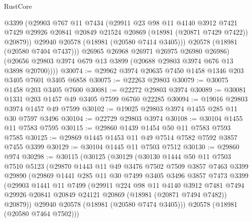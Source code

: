 \begin{lexlean}{RustCore}
\begin{coremodule}
              @3399
              (@29903
                @767
                @11
                @7434
                (@29911
                  @23
                  @98
                  @11
                  @4140
                  @3912
                  @7421
                  @7429
                  @29926
                  @20841
                  @20849
                  @21524
                  @20869
                  (@18981 (@20871 @7429 @7422))
                  @20879))
              @29940
              @20578
              (@18981 (@20580 @7414 @3405)))
            @20578
            (@18981 (@20580 @7404 @7437)))
          @26965
          @26968
          @26971
          @26975
          @26980
          @26986)
        (@20656 @29803 @3974 @679 @13 @3899 (@20688 @29803 @3974 @676 @13 @3898 @20700))))
@30074 := @29962 @3974 @20635 @7450 @1458 @1346 @203 @3405 @7601 @3405 @6858
@30075 := @22263 @29803
@30079 := @30075 @1458 @203 @3405 @7600
@30081 := @22272 @29803 @3974
@30089 := @30081 @1331 @203 @1457 @49 @3405 @7599 @6760 @22285
@30094 := @19016 @29803 @3974 @1457 @49 @7599
@30102 := @19025 @29803 @3974 @1455 @285 @11 @30 @7597 @3496
@30104 := @22729 @29803 @3974
@30108 := @30104 @1455 @11 @7583 @7595
@30115 := @29860 @1439 @1454 @50 @11 @7583 @7593 @7585
@30125 := @29869 @1445 @1453 @11 @49 @7514 @7582 @7592 @3857 @7455 @3399
@30129 := @30104 @1445 @11 @7503 @7512
@30130 := @29860 @974
@30298 := @30115
    (@30125
      (@30129
        (@30130
          @1444
          @50
          @11
          @7503
          @7510
          @5123
          (@29870
            @1443
            @11
            @49
            @3476
            @7502
            @7509
            @3857
            @7463
            @3399
            @29890
            (@29869
              @1441
              @285
              @11
              @30
              @7499
              @3405
              @3496
              @3857
              @7473
              @3399
              (@29903
                @1441
                @11
                @7499
                (@29911
                  @224
                  @98
                  @11
                  @4140
                  @3912
                  @7481
                  @7494
                  @29926
                  @20841
                  @20849
                  @24121
                  @20869
                  (@18981 (@20871 @7494 @7482))
                  @20879))
              @29940
              @20578
              (@18981 (@20580 @7474 @3405)))
            @20578
            (@18981 (@20580 @7464 @7502)))

\end{coremodule}
\end{lexlean}
